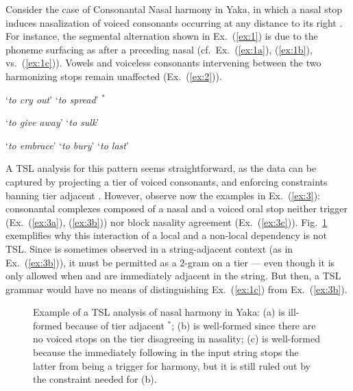 \documentclass[11pt,a4paper]{article}
\begin{document}
Consider the case of Consonantal Nasal harmony in Yaka, in which a nasal stop induces nasalization of voiced consonants occurring at any distance to its right  \cite{hyman1995nasal,WalkerYaka}.
For instance, the  segmental alternation shown in  Ex.~(\ref{ex:1}) is due to the phoneme  surfacing as  \textipa{[n]} after a preceding nasal  (cf.~Ex.~(\ref{ex:1a}), (\ref{ex:1b}), vs.~(\ref{ex:1c})).\@
Vowels and voiceless consonants intervening between the two harmonizing stops remain unaffected  (Ex.~(\ref{ex:2})).


\begin{exe}
    \ex\label{ex:1}\begin{xlist}
    	 \ex\label{ex:1a}    `\emph{to cry out}'
	 \ex\label{ex:1b}    `\emph{to spread}'
	 \ex\label{ex:1c} $^*$      
	\end{xlist}
    \ex\label{ex:2}\begin{xlist}
     	\ex\label{ex:2a} `\emph{to give away}'
    	\ex\label{ex:2b} `\emph{to sulk}'
    \end{xlist}
     \ex\label{ex:3}\begin{xlist}
    	 \ex\label{ex:3a}     `\emph{to embrace}'
	 \ex\label{ex:3b}   `\emph{to bury}'
	 \ex\label{ex:3c}   `\emph{to last}'
	\end{xlist}
\end{exe}

A TSL analysis for this pattern seems straightforward, as the data can be captured by projecting a tier of voiced consonants, and enforcing constraints banning tier adjacent  \textipa{[nd]}.\@
However, observe now the examples in  Ex.~(\ref{ex:3}): consonantal complexes composed of a nasal and a voiced oral stop neither trigger  (Ex.~(\ref{ex:3a}), (\ref{ex:3b})) nor block nasality agreement  (Ex.~(\ref{ex:3c})).\@
Fig.~\ref{fig:YAKA1} exemplifies why this interaction of a local and a non-local dependency is not TSL\@. 
Since \textipa{[nd]} is sometimes observed in a string-adjacent context (as in Ex.~(\ref{ex:3b})), it must be permitted as a $2$-gram on a tier --- even though it is only allowed when  \textipa{[n]} and \textipa{[d]} are immediately adjacent in the string.
But then,  a TSL grammar would have no means of distinguishing Ex.~(\ref{ex:1c}) from Ex.~(\ref{ex:3b}).

\begin{figure}[htbp]
\centering
\scalebox{0.8}{
      
    }
    \scalebox{0.8}{
        
    }
        \caption{Example of a TSL analysis of nasal harmony in Yaka: (a) is ill-formed because of tier adjacent $^*$\textipa{[nd]}; (b) is well-formed since  there are no voiced stops on the tier disagreeing in nasality; (c) is well-formed because the \textipa{[d]} immediately following \textipa{[n]} in the input string stops the latter from being a trigger for harmony, but it is still ruled out by the constraint needed for (b).}
        \label{fig:YAKA1}
        \end{figure}
\end{document}
